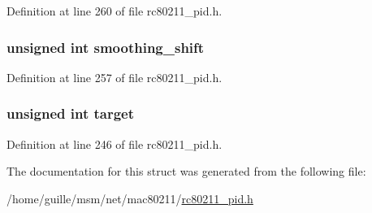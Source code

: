 Definition at line 260 of file rc80211\-\_\-pid.\-h.

\hypertarget{structrc__pid__info_a149ce33760f493b8318a62b2a7515598}{
\subsubsection[{smoothing\-\_\-shift}]{\setlength{\rightskip}{0pt plus 5cm}unsigned int smoothing\-\_\-shift}}\label{structrc__pid__info_a149ce33760f493b8318a62b2a7515598}


Definition at line 257 of file rc80211\-\_\-pid.\-h.

\hypertarget{structrc__pid__info_af10772e6d304a2ff59891323f52eb170}{
\subsubsection[{target}]{\setlength{\rightskip}{0pt plus 5cm}unsigned int target}}\label{structrc__pid__info_af10772e6d304a2ff59891323f52eb170}


Definition at line 246 of file rc80211\-\_\-pid.\-h.



The documentation for this struct was generated from the following file\-:\begin{DoxyCompactItemize}
\item 
/home/guille/msm/net/mac80211/\hyperlink{rc80211__pid_8h}{rc80211\-\_\-pid.\-h}\end{DoxyCompactItemize}
